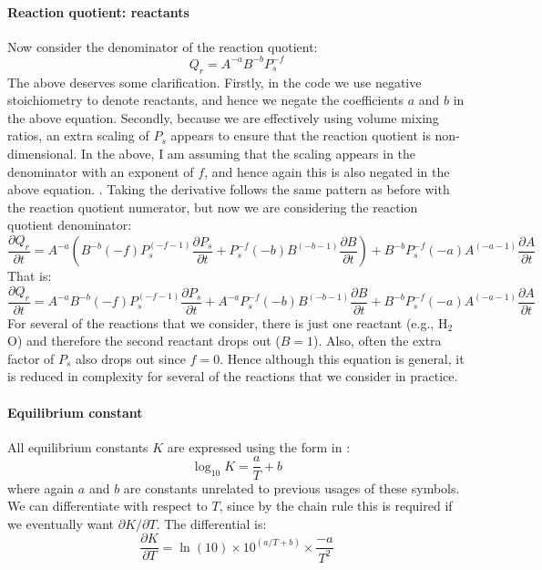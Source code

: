 \paragraph{Reaction quotient: reactants}
Now consider the denominator of the reaction quotient:
\begin{equation}
Q_r = A^{-a} B^{-b} P_s^{-f}
\end{equation}
The above deserves some clarification.  Firstly, in the code we use negative stoichiometry to denote reactants, and hence we negate the coefficients $a$ and $b$ in the above equation.  Secondly, because we are effectively using volume mixing ratios, an extra scaling of $P_s$ appears to ensure that the reaction quotient is non-dimensional.  In the above, I am assuming that the scaling appears in the denominator with an exponent of $f$, and hence again this is also negated in the above equation.  .  Taking the derivative follows the same pattern as before with the reaction quotient numerator, but now we are considering the reaction quotient denominator:
\begin{equation}
\frac{\partial Q_r}{\partial t} = A^{-a} \left( B^{-b}(-f)P_s^{(-f-1)} \frac{\partial P_s}{\partial t} + P_s^{-f} (-b)B^{(-b-1)} \frac{\partial B}{\partial t} \right) + B^{-b} P_s^{-f} (-a) A^{(-a-1)} \frac{\partial A}{\partial t}
\end{equation}
That is:
\begin{equation}
\frac{\partial Q_r}{\partial t} = A^{-a} B^{-b}(-f)P_s^{(-f-1)} \frac{\partial P_s}{\partial t} + A^{-a} P_s^{-f} (-b)B^{(-b-1)} \frac{\partial B}{\partial t} + B^{-b} P_s^{-f} (-a) A^{(-a-1)} \frac{\partial A}{\partial t}
\end{equation}
For several of the reactions that we consider, there is just one reactant (e.g., H$_2$O) and therefore the second reactant drops out ($B=1$).  Also, often the extra factor of $P_s$ also drops out since $f=0$.  Hence although this equation is general, it is reduced in complexity for several of the reactions that we consider in practice.
\paragraph{Equilibrium constant}
All equilibrium constants $K$ are expressed using the form in \cite{SF17}:
\begin{equation}
\log_{10} K = \frac{a}{T} + b
\end{equation}
where again $a$ and $b$ are constants unrelated to previous usages of these symbols.  We can differentiate with respect to $T$, since by the chain rule this is required if we eventually want $\partial K/\partial T$.  The differential is:
\begin{equation}
\frac{\partial K}{\partial T} = \ln(10) \times 10^{(a/T+b)} \times \frac{-a}{T^2}
\end{equation}
